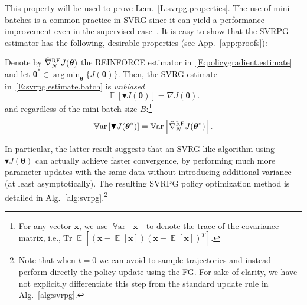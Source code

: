 \documentclass{article}
\makeatletter
\theoremstyle{remark}
\theoremstyle{definition}
\DeclareRobustCommand{\ie}{i.e.,\@\xspace}
\DeclareMathOperator*{\argmin}{arg\,min}
\DeclareMathOperator*{\EV}{\mathbb{E}}
\DeclareMathOperator{\Tr}{Tr}
\DeclareMathOperator*{\Var}{\mathbb{V}ar}
\newcommand{\EVV}[2][\ppvect \in \ppspace]{\EV_{#1}\left[{#2}\right]}
\newcommand{\vtheta}{\boldsymbol{\theta}}
\newcommand{\Reward}{\mathcal{R}}
\newcommand{\gradJ}[1]{\nabla J(#1)}
\newcommand{\gradApp}[2]{\widehat{\nabla}_{#2}J(#1)}
\newcommand{\gradBlack}[1]{\blacktriangledown J(#1)}
\newcommand{\wh}[1]{\widehat{#1}}
\makeatother
\begin{document}
This property will be used to prove Lem.~\ref{L:svrpg.properties}.
The use of mini-batches is a common practice in SVRG since it can yield a performance improvement even in the supervised case~\citep{harikandeh2015stopwasting,konevcny2016mini}. It is easy to show that the SVRPG estimator has the following, desirable properties (see App.~\ref{app:proofs}):
\begin{lemma}\label{L:svrpg.properties}
Denote by $\wh{\nabla}_N^{\textsc{RF}} J(\vtheta)$ the REINFORCE estimator in~\eqref{E:policygradient.estimate} and let $\vtheta^* \in \argmin_{\vtheta} \{J(\vtheta)\}$. Then, the SVRG estimate in~\eqref{E:svrpg.estimate.batch} is \emph{unbiased}
\[
\mathop{\mathbb{E}}
\left[\blacktriangledown J(\vtheta)\right] = \gradJ{\vtheta}.
\]
and regardless of the mini-batch size $B$:\footnote{
For any vector $\mathbf{x}$, we use $\Var[\mathbf{x}]$ to denote the trace of the covariance matrix, \ie $\Tr\EVV[]{(\mathbf{x}-\EVV[]{\mathbf{x}})(\mathbf{x}-\EVV[]{\mathbf{x}})^T}$.}
\[
	\Var\left[\gradBlack{\vtheta^*}\right] = 
    \Var\left[\wh{\nabla}_N^{\textsc{RF}}J(\vtheta^*)\right].
\]
\end{lemma}

In particular, the latter result suggests that an SVRG-like algorithm using $\gradBlack{\vtheta}$ can actually achieve faster convergence, by performing much more parameter updates with the same data without introducing additional variance (at least asymptotically).
The resulting SVRPG policy optimization method is detailed in Alg.~\ref{alg:svrpg}.\footnote{Note that when $t=0$ we can avoid to sample trajectories and instead perform directly the policy update using the FG. For sake of clarity, we have not explicitly differentiate this step from the standard update rule in Alg.~\ref{alg:svrpg}.}
\end{document}
